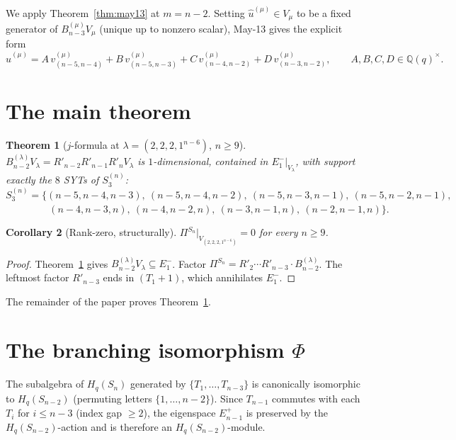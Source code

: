 \documentclass[11pt]{article}
\newtheorem{theorem}{Theorem}
\newtheorem{corollary}[theorem]{Corollary}
\theoremstyle{definition}
\begin{document}
We apply Theorem~\ref{thm:may13} at $m=n-2$.  Setting
$\hat u^{(\mu)}\in V_\mu$ to be a fixed generator of
$B_{n-3}^{(\mu)} V_\mu$ (unique up to nonzero scalar), May-13
gives the explicit form
\begin{equation}\label{eq:u-mu-form}
   \hat u^{(\mu)}
   = A\,v_{(n-5,n-4)}^{(\mu)} + B\,v_{(n-5,n-3)}^{(\mu)}
   + C\,v_{(n-4,n-2)}^{(\mu)} + D\,v_{(n-3,n-2)}^{(\mu)},
   \qquad A,B,C,D\in\mathbb{Q}(q)^\times.
\end{equation}

\section{The main theorem}

\begin{theorem}[$j$-formula at $\lambda=(2,2,2,1^{n-6})$,
$n\ge 9$]\label{thm:main}
$B_{n-2}^{(\lambda)} V_\lambda=R'_{n-2}R'_{n-1}R'_n V_\lambda$ is
$1$-dimensional, contained in $E_1^-|_{V_\lambda}$, with support
exactly the $8$ SYTs of $S_3^{(n)}$:
\[
   S_3^{(n)}=\Big\{
   (n{-}5,n{-}4,n{-}3),\ (n{-}5,n{-}4,n{-}2),\
   (n{-}5,n{-}3,n{-}1),\ (n{-}5,n{-}2,n{-}1),
\]
\[
   \phantom{S_3^{(n)}=\Big\{}\
   (n{-}4,n{-}3,n),\ (n{-}4,n{-}2,n),\
   (n{-}3,n{-}1,n),\ (n{-}2,n{-}1,n)\Big\}.
\]
\end{theorem}

\begin{corollary}[Rank-zero, structurally]\label{cor:rank-zero}
$\Pi^{S_n}|_{V_{(2,2,2,1^{n-6})}}=0$ for every $n\ge 9$.
\end{corollary}

\begin{proof}
Theorem~\ref{thm:main} gives $B_{n-2}^{(\lambda)} V_\lambda\subseteq E_1^-$.
Factor $\Pi^{S_n}=R'_2\cdots R'_{n-3}\cdot B_{n-2}^{(\lambda)}$.
The leftmost factor $R'_{n-3}$ ends in $(T_1{+}1)$, which annihilates
$E_1^-$.
\end{proof}

The remainder of the paper proves Theorem~\ref{thm:main}.

\section{The branching isomorphism $\Phi$}\label{sec:Phi}

The subalgebra of $H_q(S_n)$ generated by $\{T_1,\ldots,T_{n-3}\}$
is canonically isomorphic to $H_q(S_{n-2})$ (permuting letters
$\{1,\ldots,n-2\}$).  Since $T_{n-1}$ commutes with each
$T_i$ for $i\le n-3$ (index gap $\ge 2$), the eigenspace $E_{n-1}^+$
is preserved by the $H_q(S_{n-2})$-action and is therefore an
$H_q(S_{n-2})$-module.
\end{document}
